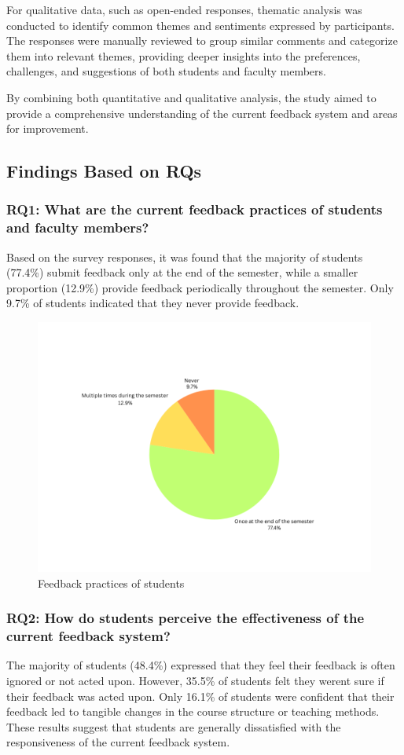 \documentclass[conference]{IEEEtran}
\begin{document}
For qualitative data, such as open-ended responses, thematic analysis was conducted to identify common themes and sentiments expressed by participants. The responses were manually reviewed to group similar comments and categorize them into relevant themes, providing deeper insights into the preferences, challenges, and suggestions of both students and faculty members.

By combining both quantitative and qualitative analysis, the study aimed to provide a comprehensive understanding of the current feedback system and areas for improvement.


\subsection{Findings Based on RQs}

\subsubsection{RQ1: What are the current feedback practices of students and faculty members?}
Based on the survey responses, it was found that the majority of students (77.4\%) submit feedback only at the end of the semester, while a smaller proportion (12.9\%) provide feedback periodically throughout the semester. Only 9.7\% of students indicated that they never provide feedback.

\begin{figure}[!htbp]
    \centering
    \includegraphics[width=0.8\linewidth]{feedback_practices.png}
    \caption{Feedback practices of students}
    \label{fig:feedback_practices}
\end{figure}



\subsubsection{RQ2: How do students perceive the effectiveness of the current feedback system?}
The majority of students (48.4\%) expressed that they feel their feedback is often ignored or not acted upon. However, 35.5\% of students felt they werent sure if their feedback was acted upon. Only 16.1\% of students were confident that their feedback led to tangible changes in the course structure or teaching methods. These results suggest that students are generally dissatisfied with the responsiveness of the current feedback system.
\end{document}

